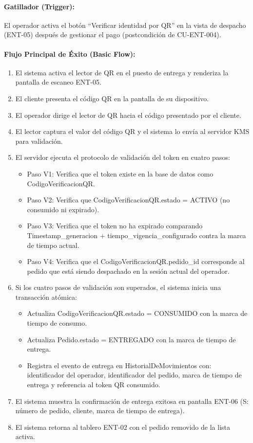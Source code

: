 \paragraph{Gatillador (Trigger):} El operador activa el botón ``Verificar identidad por QR'' en la vista de despacho (ENT-05) después de gestionar el pago (postcondición de CU-ENT-004).

\paragraph{Flujo Principal de Éxito (Basic Flow):}
\begin{enumerate}
    \item[I.] El sistema activa el lector de QR en el puesto de entrega y renderiza la pantalla de escaneo ENT-05.
    \item[II.] El cliente presenta el código QR en la pantalla de su dispositivo.
    \item[III.] El operador dirige el lector de QR hacia el código presentado por el cliente.
    \item[IV.] El lector captura el valor del código QR y el sistema lo envía al servidor KMS para validación.
    \item[V.] El servidor ejecuta el protocolo de validación del token en cuatro pasos:
    \begin{itemize}
        \item Paso V1: Verifica que el token existe en la base de datos como CodigoVerificacionQR.
        \item Paso V2: Verifica que CodigoVerificacionQR.estado = ACTIVO (no consumido ni expirado).
        \item Paso V3: Verifica que el token no ha expirado comparando Timestamp\_generacion + tiempo\_vigencia\_configurado contra la marca de tiempo actual.
        \item Paso V4: Verifica que el CodigoVerificacionQR.pedido\_id corresponde al pedido que está siendo despachado en la sesión actual del operador.
    \end{itemize}
    \item[VI.] Si los cuatro pasos de validación son superados, el sistema inicia una transacción atómica:
    \begin{itemize}
        \item Actualiza CodigoVerificacionQR.estado = CONSUMIDO con la marca de tiempo de consumo.
        \item Actualiza Pedido.estado = ENTREGADO con la marca de tiempo de entrega.
        \item Registra el evento de entrega en HistorialDeMovimientos con: identificador del operador, identificador del pedido, marca de tiempo de entrega y referencia al token QR consumido.
    \end{itemize}
    \item[VII.] El sistema muestra la confirmación de entrega exitosa en pantalla ENT-06 (S: número de pedido, cliente, marca de tiempo de entrega).
    \item[VIII.] El sistema retorna al tablero ENT-02 con el pedido removido de la lista activa.
\end{enumerate}

